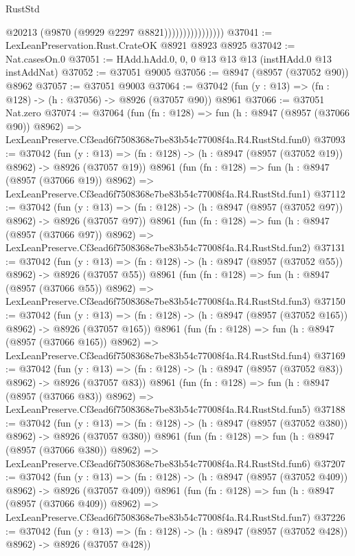 \begin{lexlean}{RustStd}
\begin{coremodule}
                                @20213
                                (@9870 (@9929 @2297 @8821))))))))))))))))
@37041 := LexLeanPreservation.Rust.CrateOK @8921 @8923 @8925
@37042 := Nat.casesOn.{0}
@37051 := HAdd.hAdd.{0, 0, 0} @13 @13 @13 (instHAdd.{0} @13 instAddNat)
@37052 := @37051 @9005
@37056 := @8947 (@8957 (@37052 @90)) @8962
@37057 := @37051 @9003
@37064 := @37042 (fun (y : @13) => (fn : @128) -> (h : @37056) -> @8926 (@37057 @90)) @8961
@37066 := @37051 Nat.zero
@37074 := @37064
    (fun (fn : @128) =>
    fun (h : @8947 (@8957 (@37066 @90)) @8962) =>
    LexLeanPreserve.Cf3ead6f7508368e7be83b54c77008f4a.R4.RustStd.fun0)
@37093 := @37042
    (fun (y : @13) => (fn : @128) -> (h : @8947 (@8957 (@37052 @19)) @8962) -> @8926 (@37057 @19))
    @8961
    (fun (fn : @128) =>
    fun (h : @8947 (@8957 (@37066 @19)) @8962) =>
    LexLeanPreserve.Cf3ead6f7508368e7be83b54c77008f4a.R4.RustStd.fun1)
@37112 := @37042
    (fun (y : @13) => (fn : @128) -> (h : @8947 (@8957 (@37052 @97)) @8962) -> @8926 (@37057 @97))
    @8961
    (fun (fn : @128) =>
    fun (h : @8947 (@8957 (@37066 @97)) @8962) =>
    LexLeanPreserve.Cf3ead6f7508368e7be83b54c77008f4a.R4.RustStd.fun2)
@37131 := @37042
    (fun (y : @13) => (fn : @128) -> (h : @8947 (@8957 (@37052 @55)) @8962) -> @8926 (@37057 @55))
    @8961
    (fun (fn : @128) =>
    fun (h : @8947 (@8957 (@37066 @55)) @8962) =>
    LexLeanPreserve.Cf3ead6f7508368e7be83b54c77008f4a.R4.RustStd.fun3)
@37150 := @37042
    (fun (y : @13) => (fn : @128) -> (h : @8947 (@8957 (@37052 @165)) @8962) -> @8926 (@37057 @165))
    @8961
    (fun (fn : @128) =>
    fun (h : @8947 (@8957 (@37066 @165)) @8962) =>
    LexLeanPreserve.Cf3ead6f7508368e7be83b54c77008f4a.R4.RustStd.fun4)
@37169 := @37042
    (fun (y : @13) => (fn : @128) -> (h : @8947 (@8957 (@37052 @83)) @8962) -> @8926 (@37057 @83))
    @8961
    (fun (fn : @128) =>
    fun (h : @8947 (@8957 (@37066 @83)) @8962) =>
    LexLeanPreserve.Cf3ead6f7508368e7be83b54c77008f4a.R4.RustStd.fun5)
@37188 := @37042
    (fun (y : @13) => (fn : @128) -> (h : @8947 (@8957 (@37052 @380)) @8962) -> @8926 (@37057 @380))
    @8961
    (fun (fn : @128) =>
    fun (h : @8947 (@8957 (@37066 @380)) @8962) =>
    LexLeanPreserve.Cf3ead6f7508368e7be83b54c77008f4a.R4.RustStd.fun6)
@37207 := @37042
    (fun (y : @13) => (fn : @128) -> (h : @8947 (@8957 (@37052 @409)) @8962) -> @8926 (@37057 @409))
    @8961
    (fun (fn : @128) =>
    fun (h : @8947 (@8957 (@37066 @409)) @8962) =>
    LexLeanPreserve.Cf3ead6f7508368e7be83b54c77008f4a.R4.RustStd.fun7)
@37226 := @37042
    (fun (y : @13) => (fn : @128) -> (h : @8947 (@8957 (@37052 @428)) @8962) -> @8926 (@37057 @428))

\end{coremodule}
\end{lexlean}
